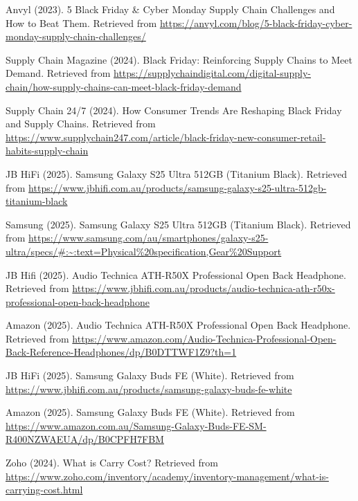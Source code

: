 \documentclass[a4paper,12pt]{article}
\begin{document}
\begin{thebibliography}{99}

    Anvyl (2023).
    5 Black Friday \& Cyber Monday Supply Chain Challenges and How to Beat Them.
    Retrieved from \url{https://anvyl.com/blog/5-black-friday-cyber-monday-supply-chain-challenges/}

    Supply Chain Magazine (2024).
    Black Friday: Reinforcing Supply Chains to Meet Demand.
    Retrieved from \url{https://supplychaindigital.com/digital-supply-chain/how-supply-chains-can-meet-black-friday-demand}

    Supply Chain 24/7 (2024).
    How Consumer Trends Are Reshaping Black Friday and Supply Chains.
    Retrieved from \url{https://www.supplychain247.com/article/black-friday-new-consumer-retail-habits-supply-chain}

    JB HiFi (2025).
    Samsung Galaxy S25 Ultra 512GB (Titanium Black).
    Retrieved from \url{https://www.jbhifi.com.au/products/samsung-galaxy-s25-ultra-512gb-titanium-black}

    Samsung (2025).
    Samsung Galaxy S25 Ultra 512GB (Titanium Black).
    Retrieved from \url{https://www.samsung.com/au/smartphones/galaxy-s25-ultra/specs/\#:~:text=Physical\%20specification,Gear\%20Support}

    JB Hifi (2025).
    Audio Technica ATH-R50X Professional Open Back Headphone.
    Retrieved from \url{https://www.jbhifi.com.au/products/audio-technica-ath-r50x-professional-open-back-headphone}

    Amazon (2025).
    Audio Technica ATH-R50X Professional Open Back Headphone.
    Retrieved from \url{https://www.amazon.com/Audio-Technica-Professional-Open-Back-Reference-Headphones/dp/B0DTTWF1Z9?th=1}

    JB HiFi (2025).
    Samsung Galaxy Buds FE (White).
    Retrieved from \url{https://www.jbhifi.com.au/products/samsung-galaxy-buds-fe-white}

    Amazon (2025).
    Samsung Galaxy Buds FE (White).
    Retrieved from \url{https://www.amazon.com.au/Samsung-Galaxy-Buds-FE-SM-R400NZWAEUA/dp/B0CPFH7FBM}

    Zoho (2024).
    What is Carry Cost?
    Retrieved from \url{https://www.zoho.com/inventory/academy/inventory-management/what-is-carrying-cost.html}


\end{thebibliography}
\end{document}
